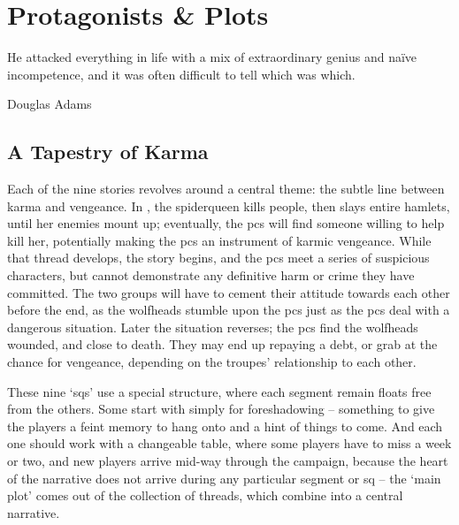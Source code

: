 \chapter{Protagonists \& Plots}
  \epigraph{He attacked everything in life with a mix of extraordinary genius and na\"ive incompetence, and it was often difficult to tell which was which.}{Douglas Adams}
\label{sideQuestIntro}

\section{A Tapestry of Karma}
\label{sqSummaries}

\begin{multicols}{2}


\noindent
Each of the nine stories revolves around a central theme: the subtle line between karma and vengeance.
In , the \gls{spiderqueen} kills people, then slays entire hamlets, until her enemies mount up; eventually, the \glspl{pc} will find someone willing to help kill her, potentially making the \glspl{pc} an instrument of karmic vengeance.
While that thread develops, the  story begins, and the \glspl{pc} meet a series of suspicious characters, but cannot demonstrate any definitive harm or crime they have committed.
The two groups will have to cement their attitude towards each other before the end, as the \glspl{wolfhead} stumble upon the \glspl{pc} just as the \glspl{pc} deal with a dangerous situation.
Later the situation reverses; the \glspl{pc} find the \glspl{wolfhead} wounded, and close to death.
They may end up repaying a debt, or grab at the chance for vengeance, depending on the troupes' relationship to each other.


These nine `\glspl{sq}' use a special structure, where each \gls{segment} remain floats free from the others.
Some start with  simply for foreshadowing -- something to give the players a feint memory to hang onto and a hint of things to come.
And each one should work with a changeable table, where some players have to miss a week or two, and new players arrive mid-way through the \gls{campaign}, because the heart of the narrative does not arrive during any particular \gls{segment} or \gls{sq} -- the `main plot' comes out of the collection of threads, which combine into a central narrative.



\end{multicols}
